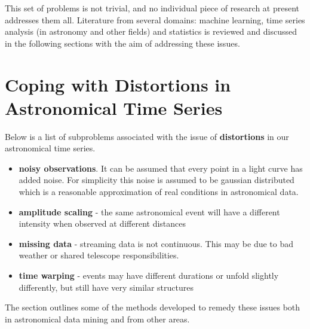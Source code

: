 	This set of problems is not trivial, and no individual piece of research at present addresses them all. Literature from several domains: machine learning, time series analysis (in astronomy and other fields) and statistics is reviewed and discussed in the following sections with the aim of addressing these issues.
		

\section{Coping with Distortions in Astronomical Time Series}
	Below is a list of subproblems associated with the issue of \textbf{distortions} in our astronomical time series.
	\begin{itemize}
		\item \textbf{noisy observations}. It can be assumed that every point in a light curve has added noise. For simplicity this noise is assumed to be gaussian distributed which is a reasonable approximation of real conditions in astronomical data.
		\item \textbf{amplitude scaling} - the same astronomical event will have a different intensity when observed at different distances
		\item \textbf{missing data} - streaming data is not continuous. This may be due to bad weather or shared telescope responsibilities.
		\item \textbf{time warping} - events may have different durations or unfold slightly differently, but still have very similar structures
	\end{itemize}
	The section outlines some of the methods developed to remedy these issues both in astronomical data mining and from other areas.
	
